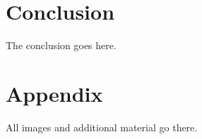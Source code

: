 \section{Conclusion}
The conclusion goes here.


\newpage 
\section{Appendix}
All images and additional material go there.
